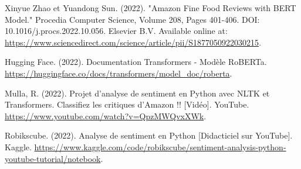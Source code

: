 \documentclass{rapportCS}
\begin{document}

\tabledematieres %







\newpage












\newpage
\begin{thebibliography}{15}

Xinyue Zhao et Yuandong Sun. (2022). "Amazon Fine Food Reviews with BERT Model." Procedia Computer Science, Volume 208, Pages 401-406. DOI: 10.1016/j.procs.2022.10.056. Elsevier B.V. Available online at: \url{https://www.sciencedirect.com/science/article/pii/S1877050922030215}.

Hugging Face. (2022). Documentation Transformers - Modèle RoBERTa. \url{https://huggingface.co/docs/transformers/model_doc/roberta}.

Mulla, R. (2022). Projet d'analyse de sentiment en Python avec NLTK et  Transformers. Classifiez les critiques d'Amazon !! [Vidéo]. YouTube. \url{https://www.youtube.com/watch?v=QpzMWQvxXWk}.

Robikscube. (2022). Analyse de sentiment en Python  [Didacticiel sur YouTube]. Kaggle. \url{https://www.kaggle.com/code/robikscube/sentiment-analysis-python-youtube-tutorial/notebook}.


\end{thebibliography}




\newpage
\listoffigures
\end{document}
